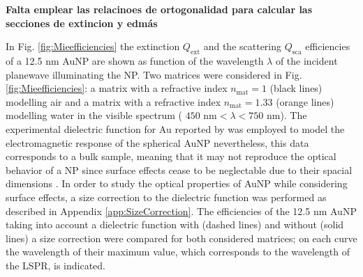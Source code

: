 
\textbf{Falta emplear las relacinoes de ortogonalidad para calcular las secciones de extincion y edmás}
\clearpage


In Fig. \ref{fig:Mieefficiencies} the extinction  $Q_\text{ext}$ and the scattering  $Q_\text{sca}$ efficiencies of a 12.5 nm AuNP are shown as function of the wavelength $\lambda$ of the incident planewave illuminating the NP. Two matrices were considered in Fig. \ref{fig:Mieefficiencies}: a matrix with a refractive index $n_\text{mat} = 1$ (black lines) modelling air and a matrix with a refractive index $n_\text{mat} = 1.33$ (orange lines) modelling water in the visible spectrum ( $450\text{ nm} < \lambda < 750 \text{ nm}$).  The experimental dielectric function for Au reported by \citeauthor{johnson_optical_1972} \cite{johnson_optical_1972}  was employed to model the electromagnetic response of the spherical AuNP nevertheless, this data corresponds to a bulk sample, meaning that it may not reproduce the optical behavior of a NP since surface effects cease to be neglectable  due to their spacial dimensions \cite{noguez_surface_2007}.   In order to study  the optical properties of AuNP while considering  surface effects,  a size correction to the dielectric function was performed as described in Appendix \ref{app:SizeCorrection}. The efficiencies of the 12.5 nm AuNP  taking into account a dielectric function with (dashed lines) and without (solid lines) a size correction were compared for both considered matrices; on each curve the wavelength of their maximum value, which corresponds to the wavelength of the LSPR, is indicated.


